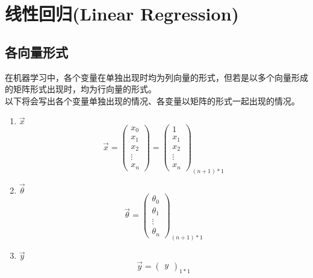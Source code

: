 \section{线性回归(Linear Regression)}
\subsection{各向量形式}
在机器学习中，各个变量在单独出现时均为列向量的形式，但若是以多个向量形成的矩阵形式出现时，均为行向量的形式。\\
以下将会写出各个变量单独出现的情况、各变量以矩阵的形式一起出现的情况。
\begin{enumerate}
\item $\vec{x}$
\begin{equation}
	\vec{x} = \left(\begin{matrix}
				x_0 \\ x_1 \\ x_2 \\ \vdots \\ x_n
			\end{matrix}\right)
			= \left(\begin{matrix}
				1 \\ x_1 \\ x_2 \\ \vdots \\ x_n
			\end{matrix}\right)_{(n+1)*1}
\end{equation}

\item $\vec{\theta}$
\begin{equation}
	\vec{\theta} = \left(\begin{matrix}
					\theta_0 \\ \theta_1 \\ \vdots \\ \theta_n
				\end{matrix}\right)_{(n+1)*1}
\end{equation}

\item $\vec{y}$
\begin{equation}
	\vec{y} = \left(\begin{matrix}
				y
			\end{matrix}\right)_{1*1}
\end{equation}


\end{enumerate}
